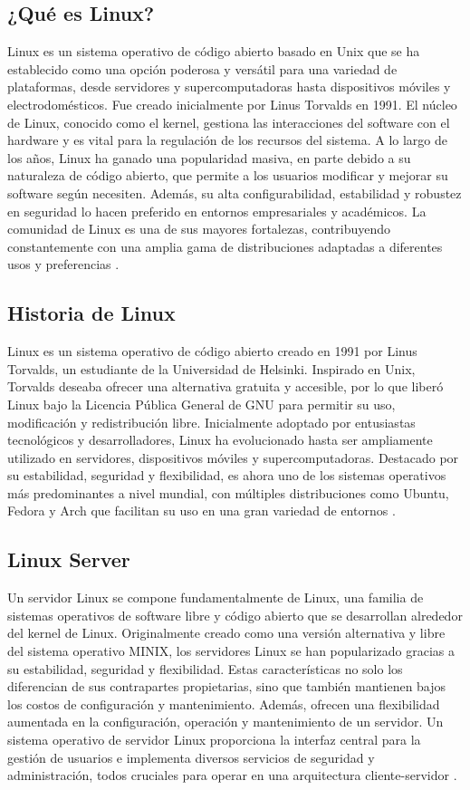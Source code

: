 \subsection{¿Qué es Linux?}
Linux es un sistema operativo de código abierto basado en Unix que se ha establecido como una opción poderosa y versátil para una variedad de plataformas, desde servidores y supercomputadoras hasta dispositivos móviles y electrodomésticos. Fue creado inicialmente por Linus Torvalds en 1991. El núcleo de Linux, conocido como el kernel, gestiona las interacciones del software con el hardware y es vital para la regulación de los recursos del sistema. A lo largo de los años, Linux ha ganado una popularidad masiva, en parte debido a su naturaleza de código abierto, que permite a los usuarios modificar y mejorar su software según necesiten. Además, su alta configurabilidad, estabilidad y robustez en seguridad lo hacen preferido en entornos empresariales y académicos. La comunidad de Linux es una de sus mayores fortalezas, contribuyendo constantemente con una amplia gama de distribuciones adaptadas a diferentes usos y preferencias \cite{Linux}.

\subsection{Historia de Linux}
Linux es un sistema operativo de código abierto creado en 1991 por Linus Torvalds, un estudiante de la Universidad de Helsinki. Inspirado en Unix, Torvalds deseaba ofrecer una alternativa gratuita y accesible, por lo que liberó Linux bajo la Licencia Pública General de GNU para permitir su uso, modificación y redistribución libre. Inicialmente adoptado por entusiastas tecnológicos y desarrolladores, Linux ha evolucionado hasta ser ampliamente utilizado en servidores, dispositivos móviles y supercomputadoras. Destacado por su estabilidad, seguridad y flexibilidad, es ahora uno de los sistemas operativos más predominantes a nivel mundial, con múltiples distribuciones como Ubuntu, Fedora y Arch que facilitan su uso en una gran variedad de entornos \cite{HistoriaLinux}.

\subsection{Linux Server}
Un servidor Linux se compone fundamentalmente de Linux, una familia de sistemas operativos de software libre y código abierto que se desarrollan alrededor del kernel de Linux. Originalmente creado como una versión alternativa y libre del sistema operativo MINIX, los servidores Linux se han popularizado gracias a su estabilidad, seguridad y flexibilidad. Estas características no solo los diferencian de sus contrapartes propietarias, sino que también mantienen bajos los costos de configuración y mantenimiento. Además, ofrecen una flexibilidad aumentada en la configuración, operación y mantenimiento de un servidor. Un sistema operativo de servidor Linux proporciona la interfaz central para la gestión de usuarios e implementa diversos servicios de seguridad y administración, todos cruciales para operar en una arquitectura cliente-servidor \cite{LinuxServer}.


